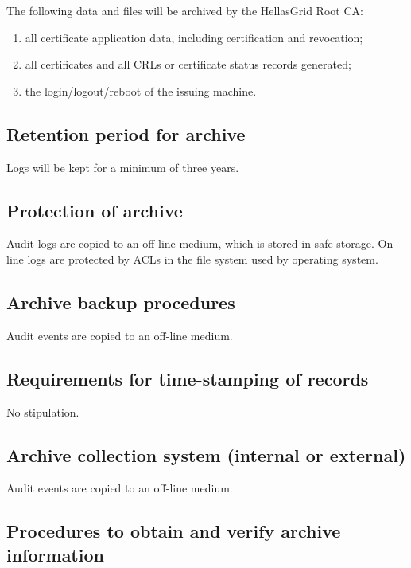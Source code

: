 \documentclass[11pt,a4paper,titlepage]{book}
\begin{document}
The following data and files will be archived by the HellasGrid Root CA:

\begin{enumerate}
\item{all certificate application data, including certification and revocation;}
\item{all certificates and all CRLs or certificate status records generated;}
\item{the login/logout/reboot of the issuing machine.}
\end{enumerate}

\subsection{Retention period for archive}

Logs will be kept for a minimum of three years.

\subsection{Protection of archive}

Audit logs are copied to an off-line medium, which is stored in safe storage. On-line logs are protected by ACLs in the file system used by operating system.

\subsection{Archive backup procedures}

Audit events are copied to an off-line medium.

\subsection{Requirements for time-stamping of records}

No stipulation. 

\subsection{Archive collection system (internal or external)}

Audit events are copied to an off-line medium.

\subsection{Procedures to obtain and verify archive information}
\end{document}
